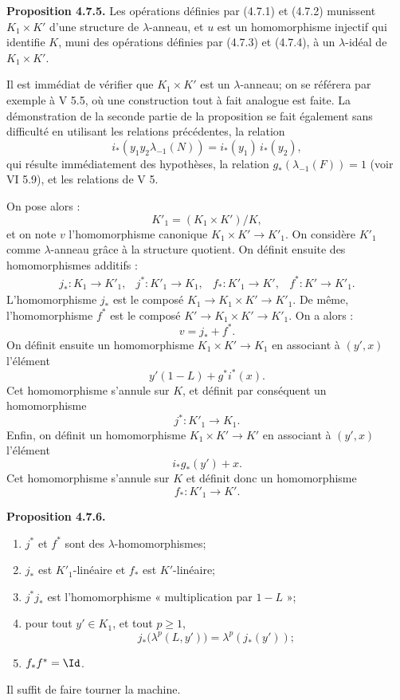 \documentclass[11pt]{article}
\begin{document}
\textbf{Proposition 4.7.5.} Les opérations définies par (4.7.1) et (4.7.2) munissent \(K_1\times K'\) d'une structure de \(\lambda\)-anneau, et \(u\) est un homomorphisme injectif qui identifie \(K\), muni des opérations définies par (4.7.3) et (4.7.4), à un \(\lambda\)-idéal de \(K_1\times K'\).

Il est immédiat de vérifier que \(K_1\times K'\) est un \(\lambda\)-anneau; on se référera par exemple à V 5.5, où une construction tout à fait analogue est faite. La démonstration de la seconde partie de la proposition se fait également sans difficulté en utilisant les relations précédentes, la relation
\[
  i_*(y_1y_2\lambda_{-1}(N))=i_*(y_1)\,i_*(y_2),
\]
qui résulte immédiatement des hypothèses, la relation \(g_*(\lambda_{-1}(F))=1\) (voir VI 5.9), et les relations de V 5.

On pose alors :
\[
  K'_1=(K_1\times K')/K,
\]
et on note \(v\) l'homomorphisme canonique \(K_1\times K'\to K'_1\). On considère \(K'_1\) comme \(\lambda\)-anneau grâce à la structure quotient. On définit ensuite des homomorphismes additifs :
\[
\begin{array}{llll}
j_*:K_1\to K'_1, & j^*:K'_1\to K_1, &
f_*:K'_1\to K', & f^*:K'\to K'_1 .
\end{array}
\]
L'homomorphisme \(j_*\) est le composé \(K_1\to K_1\times K'\to K'_1\). De même, l'homomorphisme \(f^*\) est le composé \(K'\to K_1\times K'\to K'_1\). On a alors :
\[
  v=j_*+f^*.
\]
On définit ensuite un homomorphisme \(K_1\times K'\to K_1\) en associant à \((y',x)\) l'élément
\[
  y'(1-L)+g^*i^*(x).
\]
Cet homomorphisme s'annule sur \(K\), et définit par conséquent un homomorphisme
\[
  j^*:K'_1\longrightarrow K_1.
\]
Enfin, on définit un homomorphisme \(K_1\times K'\to K'\) en associant à \((y',x)\) l'élément
\[
  i_*g_*(y')+x.
\]
Cet homomorphisme s'annule sur \(K\) et définit donc un homomorphisme
\[
  f_*:K'_1\longrightarrow K'.
\]

\textbf{Proposition 4.7.6.}
\begin{enumerate}[label=\roman*)]
\item \(j^*\) et \(f^*\) sont des \(\lambda\)-homomorphismes;
\item \(j_*\) est \(K'_1\)-linéaire et \(f_*\) est \(K'\)-linéaire;
\item \(j^*j_*\) est l'homomorphisme « multiplication par \(1-L\) »;
\item pour tout \(y'\in K_1\), et tout \(p\ge1\),
\[
  j_*\bigl(\lambda^p(L,y')\bigr)=\lambda^p(j_*(y'));
\]
\item \(f_*f^*=\Id\).
\end{enumerate}
Il suffit de faire tourner la machine.
\end{document}
